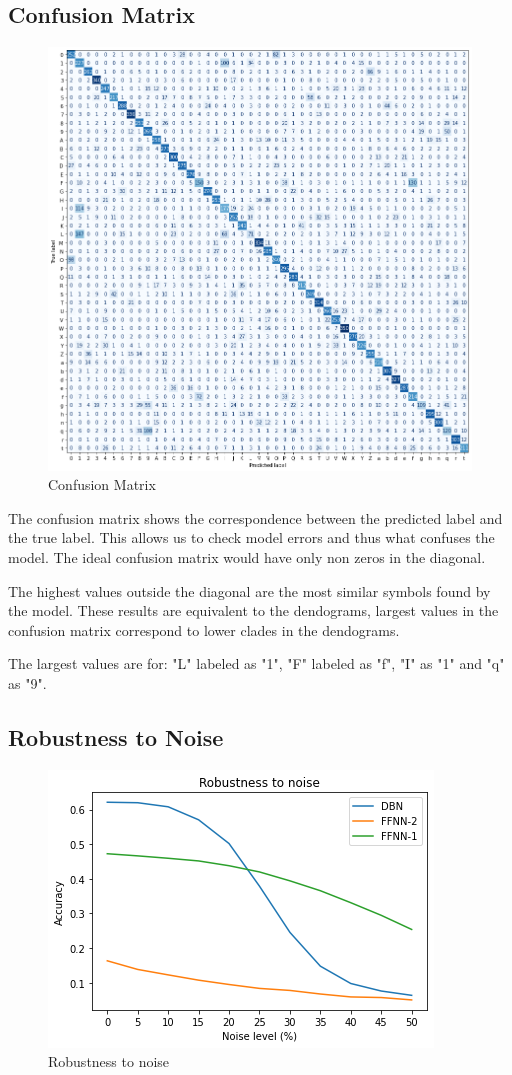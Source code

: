 \documentclass[a4paper, 11pt]{article}
\begin{document}
		\subsection{Confusion Matrix}	
			\begin{figure}[H]
				\centering
				\includegraphics[width=.9\linewidth]{confmatBlue2.png}
				\caption{Confusion Matrix}
				\label{fig:confmat}
			\end{figure}
		
			The confusion matrix shows the correspondence between the predicted label and the true label.
			This allows us to check model errors and thus what confuses the model.
			The ideal confusion matrix would have only non zeros in the diagonal.
			
			The highest values outside the diagonal are the most similar symbols found by the model.
			These results are equivalent to the dendograms, largest values in the confusion matrix correspond to lower clades in the dendograms.

			The largest values are for: "L" labeled as "1", "F" labeled as "f", "I" as "1" and "q" as "9".
			 
			
		\subsection{Robustness to Noise}	
			\begin{figure}[H]
				\centering
				\includegraphics[width=.5\linewidth]{noise3.png} 
				\caption{Robustness to noise}
				\label{fig:robNoise}
			\end{figure}
		
\end{document}
